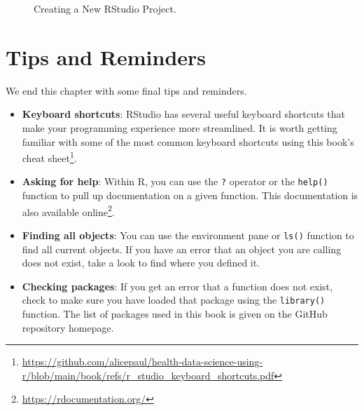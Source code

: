 \documentclass[
  letterpaper,
]{latex/krantz}
\renewcommand{\href}[2]{#2\footnote{\url{#1}}}
\begin{document}
\begin{figure}


\caption{\label{fig-new-project}Creating a New RStudio Project.}

\end{figure}%

\section{Tips and Reminders}\label{tips-and-reminders}

We end this chapter with some final tips and reminders.

\begin{itemize}
\item
  \textbf{Keyboard shortcuts}: RStudio has several useful keyboard
  shortcuts that make your programming experience more streamlined. It
  is worth getting familiar with some of the most common keyboard
  shortcuts using this book's
  \href{https://github.com/alicepaul/health-data-science-using-r/blob/main/book/refs/r_studio_keyboard_shortcuts.pdf}{cheat
  sheet}.
\item
  \textbf{Asking for help}: Within R, you can use the \texttt{?}
  operator or the \texttt{help()}
   function to pull up
  documentation on a given function. This documentation is also
  available \href{https://rdocumentation.org/}{online}.
\item
  \textbf{Finding all objects}: You can use the environment pane or
  \texttt{ls()}  function to find
  all current objects. If you have an error that an object you are
  calling does not exist, take a look to find where you defined it.
\item
  \textbf{Checking packages}: If you get an error that a function does
  not exist, check to make sure you have loaded that package using the
  \texttt{library()} function. The list of packages used in this book is
  given on the GitHub repository homepage.
\end{itemize}
\end{document}
